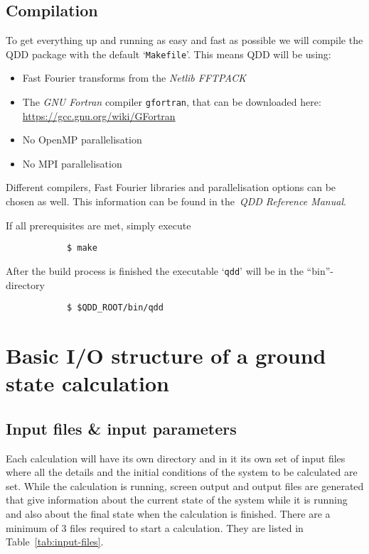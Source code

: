 \documentclass[11pt,a4paper]{article}
\begin{document}
		\subsection{Compilation}
			To get everything up and running as easy and fast as possible we will compile the QDD package with the default `\texttt{Makefile}'. This means QDD will be using:
		\begin{itemize}
			\item Fast Fourier transforms from the \textit{Netlib FFTPACK}
			\item The \textit{GNU Fortran} compiler \texttt{gfortran}, that can be downloaded here:\\ \url{https://gcc.gnu.org/wiki/GFortran}
			\item No OpenMP parallelisation
			\item No MPI parallelisation
		\end{itemize}
		Different compilers, Fast Fourier libraries and parallelisation options can be chosen as well. This information can be found in the~\textit{QDD Reference Manual}.
		
		If all prerequisites are met, simply execute
		\begin{verbatim}
			$ make
		\end{verbatim}
		After the build process is finished the executable `\texttt{qdd}' will be in the ``bin''-directory
		\begin{verbatim}
			$ $QDD_ROOT/bin/qdd
		\end{verbatim}

	\section{Basic I/O structure of a ground state calculation}
		
		\subsection{Input files \& input parameters}
		Each calculation will have its own directory and in it its own set of input files where all the details and the initial conditions of the system to be calculated are set. While the calculation is running, screen output and output files are generated that give information about the current state of the system while it is running and also about the final state when the calculation is finished. There are a minimum of 3 files required to start a calculation. They are listed in Table~\ref{tab:input-files}.
		
\end{document}
